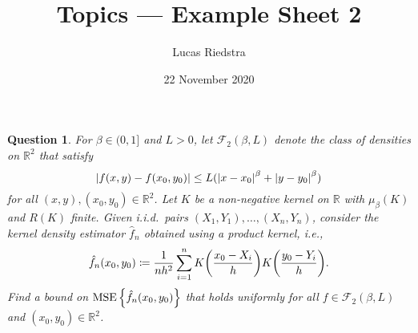 \documentclass{article}
\title{Topics  --- Example Sheet  2} %
\author{Lucas Riedstra}
\date{22 November 2020} %
\theoremstyle{plain}
\newtheorem{question}{Question}
\theoremstyle{remark}
\newcommand{\Bb}{\mathbb}
\newcommand{\Cal}{\mathcal}
\newcommand{\RR}{\Bb R}
\newcommand\FF{\Cal F}
\newcommand\ceq\coloneqq %
\DeclareMathOperator\MSE{MSE}
\begin{document}
\maketitle

\setcounter{question}{1}

\begin{question}
	For $\beta \in (0, 1]$ and $L > 0$, let $\FF_2(\beta, L)$ denote the class of densities on $\RR^2$ that satisfy
	\[
	\abs{f(x, y) - f(x_0, y_0)} \leq L(\abs{x - x_0}^\beta + \abs{y - y_0}^\beta)
	\]
	for all $(x, y), (x_0, y_0) \in \RR^2$. Let $K$ be a non-negative kernel on $\RR$ with $\mu_\beta(K)$ and $R(K)$ finite. Given i.i.d.\ pairs $(X_1, Y_1), \dotsc, (X_n, Y_n)$, consider the kernel density estimator $\hat f_n$ obtained using a product kernel, i.e., 
	\[
	\hat f_n(x_0, y_0) \ceq \frac1{nh^2} \sum_{i=1}^n K\qty(\frac{x_0 - X_i}{h}) K\qty(\frac{y_0 - Y_i}{h}). 
	\]
	Find a bound on $\MSE\qty{\hat f_n(x_0, y_0)}$ that holds uniformly for all $f \in \FF_2(\beta, L)$ and $(x_0, y_0) \in \RR^2$. 
\end{question}
\end{document}
